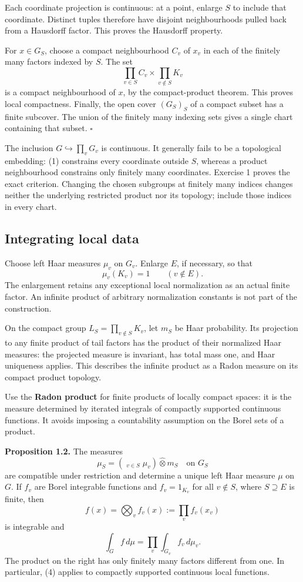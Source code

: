 \documentclass[
  english,
  11pt,
  a4paper,
]{article}
\begin{document}
Each coordinate projection is continuous: at a point, enlarge \(S\) to
include that coordinate. Distinct tuples therefore have disjoint
neighbourhoods pulled back from a Hausdorff factor. This proves the
Hausdorff property.

For \(x\in G_S\), choose a compact neighbourhood \(C_v\) of \(x_v\) in
each of the finitely many factors indexed by \(S\). The set
\[\prod_{v\in S}C_v\times\prod_{v\notin S}K_v\] is a compact
neighbourhood of \(x\), by the compact-product theorem. This proves
local compactness. Finally, the open cover \((G_S)_S\) of a compact
subset has a finite subcover. The union of the finitely many indexing
sets gives a single chart containing that subset. \(\square\)

The inclusion \(G\hookrightarrow\prod_vG_v\) is continuous. It generally
fails to be a topological embedding: (1) constrains every coordinate
outside \(S\), whereas a product neighbourhood constrains only finitely
many coordinates. Exercise 1 proves the exact criterion. Changing the
chosen subgroups at finitely many indices changes neither the underlying
restricted product nor its topology; include those indices in every
chart.

\subsection{Integrating local
data}\label{NT-ADL-01--integrating-local-data}

Choose left Haar measures \(\mu_v\) on \(G_v\). Enlarge \(E\), if
necessary, so that \[\mu_v(K_v)=1\qquad(v\notin E).
\tag{2}\] The enlargement retains any exceptional local normalization as
an actual finite factor. An infinite product of arbitrary normalization
constants is not part of the construction.

On the compact group \(L_S=\prod_{v\notin S}K_v\), let \(m_S\) be Haar
probability. Its projection to any finite product of tail factors has
the product of their normalized Haar measures: the projected measure is
invariant, has total mass one, and Haar uniqueness applies. This
describes the infinite product as a Radon measure on its compact product
topology.

Use the \textbf{Radon product} for finite products of locally compact
spaces: it is the measure determined by iterated integrals of compactly
supported continuous functions. It avoids imposing a countability
assumption on the Borel sets of a product.

\textbf{Proposition 1.2.} The measures
\[\mu_S=\left(\mathop{\widehat\bigotimes}_{v\in S}\mu_v\right)
\widehat\otimes m_S
\quad\text{on }G_S
\tag{3}\] are compatible under restriction and determine a unique left
Haar measure \(\mu\) on \(G\). If \(f_v\) are Borel integrable functions
and \(f_v=1_{K_v}\) for all \(v\notin S\), where \(S\supseteq E\) is
finite, then \[f(x)=\bigotimes_v f_v(x):=\prod_v f_v(x_v)\] is
integrable and \[\int_Gf\,d\mu=\prod_v\int_{G_v}f_v\,d\mu_v.
\tag{4}\] The product on the right has only finitely many factors
different from one. In particular, (4) applies to compactly supported
continuous local functions.
\end{document}
